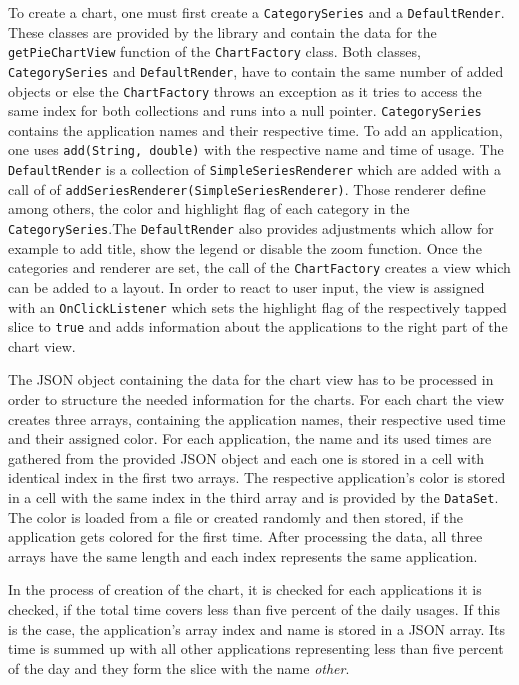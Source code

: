 To  create a chart, one must first create a \lstinline$CategorySeries$ and a \lstinline$DefaultRender$. These classes are provided by the library and contain the data for the \lstinline$getPieChartView$ function of the \lstinline$ChartFactory$ class. Both classes, \lstinline$CategorySeries$ and \lstinline$DefaultRender$, have to contain the same number of added objects or else the \lstinline$ChartFactory$ throws an exception as it tries to access the same index for both collections and runs into a null pointer. \lstinline$CategorySeries$ contains the application names and their respective time. To add an application, one uses \lstinline$add(String, double)$ with the respective name and time of usage. The \lstinline$DefaultRender$ is a collection of \lstinline$SimpleSeriesRenderer$ which are added with a call of of \lstinline$addSeriesRenderer(SimpleSeriesRenderer)$. Those renderer define among others, the color and highlight flag of each category in the \lstinline$CategorySeries$.The \lstinline$DefaultRender$ also provides adjustments which allow for example to add title, show the legend or disable the zoom function. Once the categories and renderer are set, the call of the \lstinline$ChartFactory$ creates a view which can be added to a layout. In order to react to user input, the view is assigned with an \lstinline$OnClickListener$ which sets the highlight flag of the respectively tapped slice to \lstinline$true$ and adds information about the applications to the right part of the chart view.

The  JSON object containing the data for the chart view has to be processed in order to structure the needed information for the charts. For each chart the view creates three arrays, containing the application names, their respective used time and their assigned color. For each application, the name and its used times are gathered from the provided JSON object and each one is stored in a cell with identical index in the first two arrays. The respective application's color is stored in a cell with the same index in the third array and is provided by the \lstinline$DataSet$. The color is loaded from a file or created randomly and then stored, if the application gets colored for the first time. After processing the data, all three arrays have the same length and each index represents the same application.

In the process of creation of the chart, it is checked for each applications it is checked, if the total time covers less than five percent of the daily usages. If this is the case, the application's array index and name is stored in a JSON array. Its time is summed up with all other applications representing less than five percent of the day and they form the slice with the name \emph{other}.

